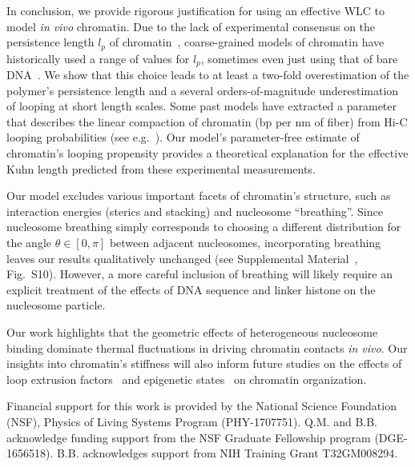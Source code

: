 \documentclass[%
 reprint,
superscriptaddress,
showpacs,preprintnumbers,
 amsmath,amssymb,
 aps,
 prl,
floatfix,
]{revtex4-1}
\begin{document}
In conclusion, we provide rigorous justification for using
    an effective WLC to model \textit{in vivo} chromatin. Due to the lack of experimental consensus on the persistence length $l_p$ of chromatin~\cite{langowski2006a},  coarse-grained models of chromatin have historically used a range of values for $l_p$, sometimes even just using that of bare DNA~\cite{benedetti2017,macpherson2018,nuebler2018}.
We show that this choice leads to at least a
    two-fold overestimation of the polymer's {\color{red}persistence length}
    and a
    several orders-of-magnitude underestimation of looping at short length scales.
Some past models have extracted a parameter that describes the linear compaction of
    chromatin (bp per nm of fiber) from Hi-C looping probabilities
    (see e.g.~\cite{ghosh2018, rosa2008}).
Our model's parameter-free estimate of chromatin's {\color{red}looping propensity} provides a theoretical explanation for the effective
    Kuhn length predicted from these experimental measurements.



Our model excludes various important facets of chromatin's structure, such as
    interaction energies (sterics and stacking) and nucleosome ``breathing''.
Since nucleosome breathing simply corresponds to choosing a different distribution for the angle $\theta \in [0, \pi]$
    between adjacent nucleosomes, incorporating breathing leaves our results qualitatively unchanged (see Supplemental Material~\cite{supplemental}, Fig.~S10).
However, a more careful inclusion of breathing will likely require an explicit treatment of the
    effects of DNA sequence and linker histone on the nucleosome particle.


Our work highlights that the geometric effects of heterogeneous nucleosome binding
    dominate thermal fluctuations {\color{red}in driving chromatin contacts} \textit{in vivo}.
Our insights into chromatin's {\color{red}stiffness} will also inform future studies on the effects of
    loop extrusion factors~\cite{nuebler2018,brackley2017} and epigenetic
    states~\cite{macpherson2018,michieletto2016,brackley2017}
    on chromatin organization.\@

\begin{acknowledgements}
Financial support for this work is provided by the National Science Foundation
    (NSF), Physics of Living Systems Program (PHY-1707751). Q.M. and B.B.
    acknowledge funding support from the NSF Graduate Fellowship program
    (DGE-1656518). B.B. acknowledges support from NIH Training Grant
    T32GM008294.
\end{acknowledgements}


\end{document}
